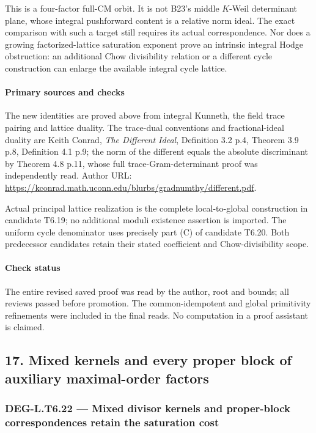 \documentclass[11pt,a4paper]{article}
\theoremstyle{definition}
\begin{document}
This is a four-factor full-CM orbit. It is not B23's middle \(K\)-Weil determinant plane, whose integral pushforward content is a relative norm ideal. The exact comparison with such a target still requires its actual correspondence. Nor does a growing factorized-lattice saturation exponent prove an intrinsic integral Hodge obstruction: an additional Chow divisibility relation or a different cycle construction can enlarge the available integral cycle lattice.

\paragraph{Primary sources and checks}\label{primary-sources-and-checks}

The new identities are proved above from integral Kunneth, the field trace pairing and lattice duality. The trace-dual conventions and fractional-ideal duality are Keith Conrad, \emph{The Different Ideal}, Definition 3.2 p.4, Theorem 3.9 p.8, Definition 4.1 p.9; the norm of the different equals the absolute discriminant by Theorem 4.8 p.11, whose full trace-Gram-determinant proof was independently read. Author URL: \url{https://kconrad.math.uconn.edu/blurbs/gradnumthy/different.pdf}.

Actual principal lattice realization is the complete local-to-global construction in candidate T6.19; no additional moduli existence assertion is imported. The uniform cycle denominator uses precisely part (C) of candidate T6.20. Both predecessor candidates retain their stated coefficient and Chow-divisibility scope.

\paragraph{Check status}\label{check-status-2}

The entire revised saved proof was read by the author, root and bounds; all reviews passed before promotion. The common-idempotent and global primitivity refinements were included in the final reads. No computation in a proof assistant is claimed.

\subsection{17. Mixed kernels and every proper block of auxiliary maximal-order factors}\label{mixed-kernels-and-every-proper-block-of-auxiliary-maximal-order-factors}

\subsubsection{DEG-L.T6.22 --- Mixed divisor kernels and proper-block correspondences retain the saturation cost}\label{DEG-L.T6.22}
\end{document}
